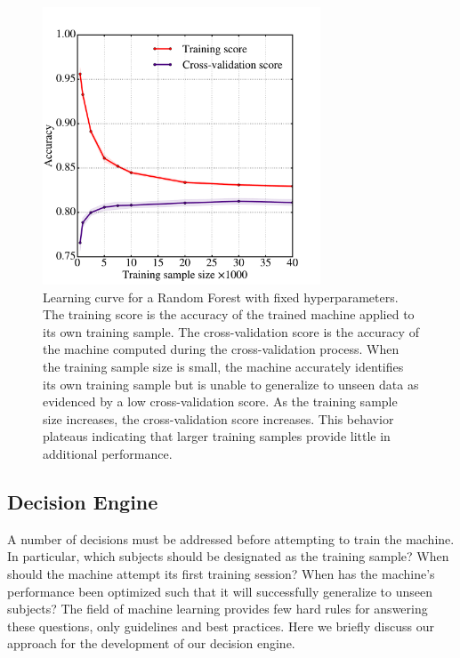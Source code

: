 \documentclass[twocolumn]{aastex6}
\begin{document}
\begin{figure}[t!]
\includegraphics[width=3.25in]{f6.pdf}
\caption{Learning curve for a Random Forest with fixed hyperparameters. The training score is the accuracy of the trained machine applied to its own training sample. The cross-validation score is the accuracy of the machine computed during the cross-validation process. When the training sample size is small, the machine accurately identifies its own training sample but is unable to generalize to unseen data as evidenced by a low cross-validation score. As the training sample size increases, the cross-validation score increases. This behavior plateaus indicating that larger training samples provide little in additional performance. \label{fig: learning curve}}
\end{figure}


\subsection{Decision Engine}\label{sec: decision engine}
A number of decisions must be addressed before attempting to train the machine. 
In particular, which subjects should be designated as the training sample? 
When should the machine attempt its first training session? 
When has the machine's performance been optimized such that it will successfully
generalize to unseen subjects? The field of machine learning provides few hard rules 
for answering these questions, only guidelines and best practices. 
Here we briefly discuss our approach for the development of our decision engine.
\end{document}
